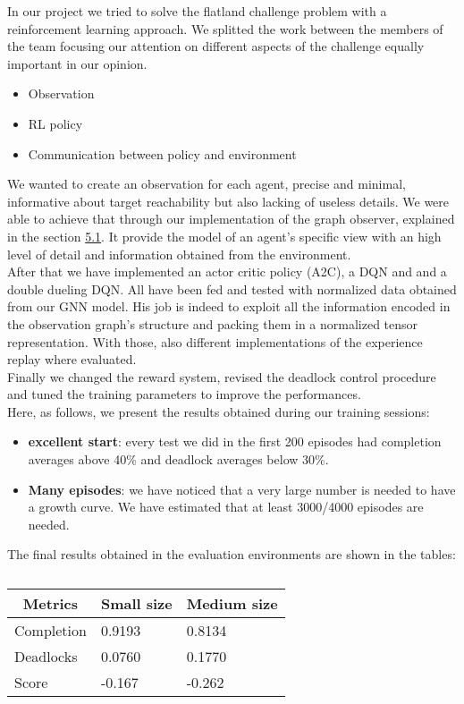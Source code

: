 In our project we tried to solve the flatland challenge problem with a reinforcement learning approach. We splitted the work between the members of the team focusing our attention on different aspects of the challenge equally important in our opinion.
\begin{itemize}
    \item Observation
    \item RL policy 
    \item Communication between policy and environment
\end{itemize}
We wanted to create an observation for each agent, precise and minimal, informative  about target reachability but also lacking of useless details. We were able to achieve that through our implementation of the graph observer, explained in the section \hyperref[sec:dagObserv]{5.1}. It provide the model of an agent's specific view with an high level of detail and information obtained from the environment. \\
After that we have implemented an actor critic policy (A2C), a DQN and and a double dueling DQN. All have been fed and tested with normalized data obtained from our GNN model. His job is indeed to exploit all the information encoded in the observation graph's structure and packing them in a normalized tensor representation. With those, also different implementations of the experience replay where evaluated.\\ 
Finally we changed the reward system, revised the deadlock control procedure and tuned the training parameters to improve the performances.\\
Here, as follows, we present the results obtained during our training sessions:
\begin{itemize}
	\item \textbf{excellent start}: every test we did in the first 200 episodes had completion averages above 40\% and deadlock averages below 30\%.
	\item \textbf{Many episodes}: we have noticed that a very large number is needed to have a growth curve. We have estimated that at least 3000/4000 episodes are needed.
\end{itemize}
The final results obtained in the evaluation environments are shown in the tables:

\begin{table}[htb]
	\centering
	\bgroup
	\def\arraystretch{1.5}%
	\begin{tabular}{|l|l|l|}
		\hline
		\multicolumn{1}{|c|}{Metrics}                         & \multicolumn{1}{c|}{Small size} & \multicolumn{1}{c|}{Medium size}                          \\ \hline
		Completion                        & 0.9193    & 0.8134    \\ \hline
		Deadlocks                         & 0.0760    & 0.1770    \\ \hline
		Score                             & -0.167    & -0.262     \\ \hline
	\end{tabular}
	\egroup
	\caption{}
	\label{tab:evaluation1}
\end{table}
